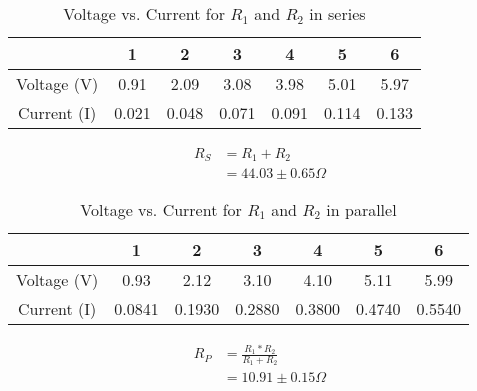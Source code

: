 \documentclass[a4paper]{article}
\begin{document}
\begin{table}[h!]
  \begin{center}
    \caption{Voltage vs. Current for \(R_1\) and \(R_2\) in series}\label{tab:table1}
    \begin{tabular}{|c|c|c|c|c|c|c|}\hline
      & 1 & 2 & 3 & 4 & 5 & 6 \\ \hline
      Voltage (V) & 0.91 & 2.09 & 3.08 & 3.98 & 5.01 & 5.97 \\ \hline
      Current (I) & 0.021 & 0.048 & 0.071 & 0.091 & 0.114 & 0.133 \\ \hline
    \end{tabular}
  \end{center}
  \begin{center}
    \begin{equation}
      \begin{split}
        R_S &= R_1 + R_2 \\
            &= \boxed{44.03 \pm 0.65 \Omega}
      \end{split}
    \end{equation}
  \end{center}
\end{table}
\begin{table}[h!]
  \begin{center}
    \caption{Voltage vs. Current for \(R_1\) and \(R_2\) in parallel}\label{tab:table1}
    \begin{tabular}{|c|c|c|c|c|c|c|}\hline
      & 1 & 2 & 3 & 4 & 5 & 6 \\ \hline
      Voltage (V) & 0.93 & 2.12 & 3.10 & 4.10 & 5.11 & 5.99 \\ \hline
      Current (I) & 0.0841 & 0.1930 & 0.2880 & 0.3800 & 0.4740 & 0.5540 \\ \hline
    \end{tabular}
  \end{center}
  \begin{center}
    \begin{equation}
      \begin{split}
        R_P &= \frac{R_1 * R_2}{R_1 + R_2} \\
            &= \boxed{10.91 \pm 0.15 \Omega}
      \end{split}
    \end{equation}
  \end{center}
\end{table}
\end{document}
